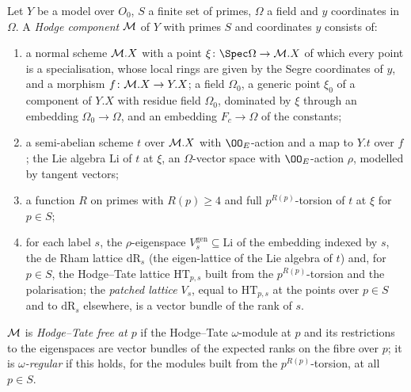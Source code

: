 \begin{definition}\label{pf:towergeo:def-hodgecpt}
Let $Y$ be a model over $O_0$, $S$ a finite set of primes, $\Omega$ a field and $y$ coordinates in
$\Omega$. A \emph{Hodge component} $\mathcal M$ of $Y$ with primes $S$ and coordinates $y$ consists of:
\begin{enumerate}[label=(\roman*)]
\item a normal scheme $\mathcal M.X$ with a point $\xi\colon\Spec\Omega\to\towergeoHC.X$ of which every
  point is a specialisation, whose local rings are given by the Segre coordinates of $y$, and a morphism
  $f\colon\mathcal M.X\to Y.X$; a field $\Omega_0$, a generic point $\xi_0$ of a component of $Y.X$ with
  residue field $\Omega_0$, dominated by $\xi$ through an embedding $\Omega_0\to\Omega$, and an embedding
  $F_c\to\Omega$ of the constants;
\item a semi-abelian scheme $t$ over $\mathcal M.X$ with $\OO_E$-action and a map to $Y.t$ over $f$;
  the Lie algebra $\mathrm{Li}$ of $t$ at $\xi$, an $\Omega$-vector space with $\OO_E$-action $\rho$,
  modelled by tangent vectors;
\item a function $R$ on primes with $R(p)\ge4$ and full $p^{R(p)}$-torsion of $t$ at $\xi$ for $p\in S$;
\item for each label $s$, the $\rho$-eigenspace $V^{\mathrm{gen}}_s\subseteq\mathrm{Li}$ of the embedding
  indexed by $s$, the de Rham lattice $\mathrm{dR}_s$ (the eigen-lattice of the Lie algebra of $t$) and,
  for $p\in S$, the Hodge--Tate lattice $\mathrm{HT}_{p,s}$ built from the $p^{R(p)}$-torsion and the
  polarisation; the \emph{patched lattice} $V_s$, equal to $\mathrm{HT}_{p,s}$ at the points over $p\in S$
  and to $\mathrm{dR}_s$ elsewhere, is a vector bundle of the rank of $s$.
\end{enumerate}
$\mathcal M$ is \emph{Hodge--Tate free at $p$} if the Hodge--Tate $\omega$-module at $p$ and its
restrictions to the eigenspaces are vector bundles of the expected ranks on the fibre over $p$; it is
\emph{$\omega$-regular} if this holds, for the modules built from the $p^{R(p)}$-torsion, at all $p\in S$.
\end{definition}

